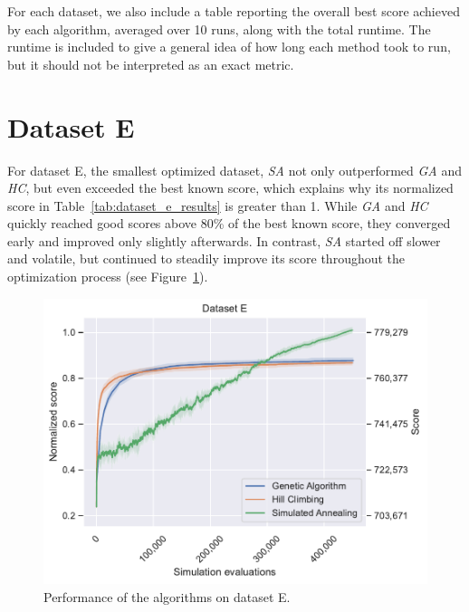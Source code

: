 For each dataset, we also include a table reporting the overall best score achieved by each algorithm, averaged over 10 runs, along with the total runtime. The runtime is included to give a general idea of how long each method took to run, but it should not be interpreted as an exact metric.

\newpage
\section{Dataset E} \label{sec:dataset_e}

For dataset E, the smallest optimized dataset, \textit{SA} not only outperformed \textit{GA} and \textit{HC}, but even exceeded the best known score, which explains why its normalized score in Table~\ref{tab:dataset_e_results} is greater than 1. While \textit{GA} and \textit{HC} quickly reached good scores above 80\% of the best known score, they converged early and improved only slightly afterwards. In contrast, \textit{SA} started off slower and volatile, but continued to steadily improve its score throughout the optimization process (see Figure~\ref{fig:dataset_e_experiment}).

\bigskip

\begin{figure}[h]
    \centering
    \includegraphics[width=\linewidth]{img/experiments/e_Genetic Algorithm_Hill Climbing_Simulated Annealing.pdf}
    \caption[Performance of the algorithms on dataset E]{
        Performance of the algorithms on dataset E.
    }
    \label{fig:dataset_e_experiment}
\end{figure}

